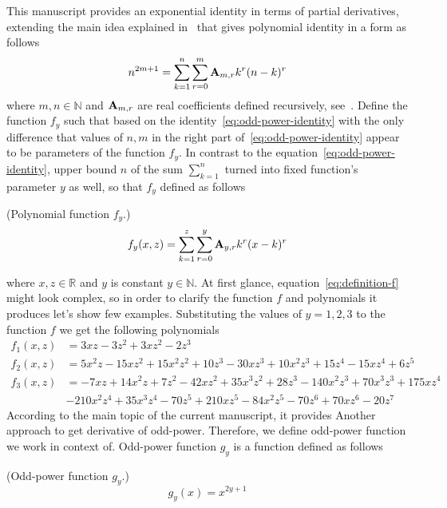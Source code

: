 This manuscript provides an exponential identity in terms of partial derivatives,
extending the main idea explained in~\cite{kolosov_2022} that gives polynomial identity in a form as follows
\begin{equation}
    n^{2m+1} = \sum_{k=1}^{n} \sum_{r=0}^{m} {\mathbf{A}} \sb{m,r} k^r (n-k)^r
    \label{eq:odd-power-identity}
\end{equation}
where $m,n \in \mathbb{N}$ and ${\mathbf{A}} \sb{m,r}$ are real coefficients defined recursively, see~\cite{kolosov2016link}.
Define the function $f_{y}$ such that based on the identity~\eqref{eq:odd-power-identity} with the only difference that
values of $n, m$ in the right part of~\eqref{eq:odd-power-identity} appear to be parameters of the function $f_{y}$.
In contrast to the equation~\eqref{eq:odd-power-identity}, upper bound $n$ of the sum $\sum_{k=1}^{n}$ turned into fixed
function's parameter $y$ as well, so that $f_{y}$ defined as follows
\begin{definition} (Polynomial function $f_{y}$.)
    \begin{equation}
        f_{y} (x, z) = \sum_{k=1}^{z} \sum_{r=0}^{y} {\mathbf{A}} \sb{y,r} k^r (x-k)^r
        \label{eq:definition-f}
    \end{equation}
\end{definition}
where $x, z\in \mathbb{R}$ and $y$ is constant $y \in \mathbb{N}$.
At first glance, equation~\eqref{eq:definition-f} might look complex, so in order to clarify
the function $f$ and polynomials it produces let's show few examples.
Substituting the values of $y=1,2,3$ to the function $f$ we get the following polynomials
\begin{align*}
    f_{1} (x, z) &= 3 x z - 3 z^2 + 3 x z^2 - 2 z^3 \\
    f_{2} (x, z) &= 5 x^2 z - 15 x z^2 + 15 x^2 z^2 + 10 z^3 - 30 x z^3 + 10 x^2 z^3 +
    15 z^4 - 15 x z^4 + 6 z^5 \\
    f_{3} (x, z) &= -7 x z + 14 x^2 z + 7 z^2 - 42 x z^2 + 35 x^3 z^2 + 28 z^3 - 140 x^2 z^3 + 70 x^3 z^3 + 175 x z^4 \\
    &- 210 x^2 z^4 + 35 x^3 z^4 - 70 z^5 + 210 x z^5 - 84 x^2 z^5 - 70 z^6 + 70 x z^6 - 20 z^7
\end{align*}
According to the main topic of the current manuscript, it provides Another approach to get derivative of odd-power.
Therefore, we define odd-power function we work in context of.
Odd-power function $g_y$ is a function defined as follows
\begin{definition}(Odd-power function $g_y$.)
    \begin{equation}
        g_{y}(x) = x^{2y + 1}
        \label{eq:definition-g}
    \end{equation}
\end{definition}
